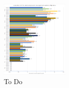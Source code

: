 \begin{figure}[ht]
\centering
\includegraphics[width=0.3\textwidth]{figuras/graphs/find_ones.png}
\caption{To Do}
\label{gph:find_ones}
\end{figure}